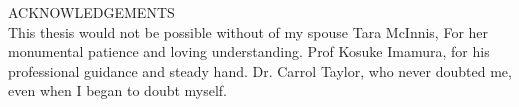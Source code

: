 ACKNOWLEDGEMENTS\\

This thesis would not be possible without of my spouse Tara McInnis, For her monumental patience and loving understanding.  Prof Kosuke Imamura, for his professional guidance and steady hand.  Dr. Carrol Taylor, who never doubted me, even when I began to doubt myself.

\newpage

